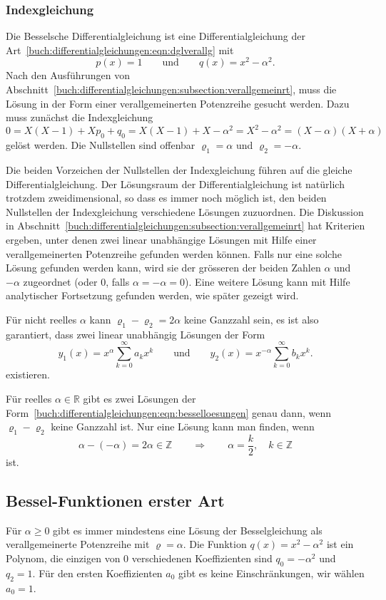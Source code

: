 %
%
\subsubsection{Indexgleichung}
Die Besselsche Differentialgleichung ist eine Differentialgleichung
der Art~\eqref{buch:differentialgleichungen:eqn:dglverallg} mit
\[
p(x) = 1
\qquad\text{und}\qquad
q(x) = x^2-\alpha^2.
\]
Nach den Ausführungen von
Abschnitt~\ref{buch:differentialgleichungen:subsection:verallgemeinrt},
muss die Lösung in der Form einer verallgemeinerten Potenzreihe 
gesucht werden.
Dazu muss zunächst die Indexgleichung
\[
0
=
X(X-1) + Xp_0 + q_0
=
X(X-1) + X - \alpha^2
=
X^2-\alpha^2
=
(X-\alpha)(X+\alpha)
\]
gelöst werden.
Die Nullstellen sind offenbar $\varrho_1=\alpha$ und $\varrho_2=-\alpha$.

Die beiden Vorzeichen der Nullstellen der Indexgleichung führen
auf die gleiche Differentialgleichung.
Der Lösungsraum der Differentialgleichung ist natürlich trotzdem
zweidimensional, so dass es immer noch möglich ist, den
beiden Nullstellen der Indexgleichung verschiedene Lösungen
zuzuordnen.
Die Diskussion in
Abschnitt~\ref{buch:differentialgleichungen:subsection:verallgemeinrt}
hat Kriterien ergeben, unter denen zwei linear unabhängige Lösungen
mit Hilfe einer verallgemeinerten Potenzreihe gefunden werden können.
Falls nur eine solche Lösung gefunden werden kann, wird sie der grösseren
der beiden Zahlen $\alpha$ und $-\alpha$ zugeordnet
(oder $0$, falls $\alpha=-\alpha=0$).
Eine weitere Lösung kann mit Hilfe analytischer Fortsetzung gefunden werden,
wie später gezeigt wird.

Für nicht reelles $\alpha$ kann $\varrho_1-\varrho_2=2\alpha$ keine 
Ganzzahl sein, es ist also garantiert, dass zwei linear unabhängig
Lösungen der Form
\begin{equation}
y_1(x) = x^\alpha\sum_{k=0}^\infty a_kx^k
\qquad\text{und}\qquad
y_2(x) = x^{-\alpha}\sum_{k=0}^\infty b_kx^k.
\label{buch:differentialgleichungen:eqn:besselloesungen}
\end{equation}
existieren.

Für reelles $\alpha\in\mathbb{R}$ gibt es zwei Lösungen der
Form~\eqref{buch:differentialgleichungen:eqn:besselloesungen}
genau dann, wenn $\varrho_1-\varrho_2$ keine Ganzzahl ist.
Nur eine Lösung kann man finden, wenn 
\[
\alpha-(-\alpha)=2\alpha \in \mathbb{Z}
\qquad\Rightarrow\qquad
\alpha = \frac{k}{2},\quad k\in\mathbb{Z}
\]
ist.

%
%
\subsection{Bessel-Funktionen erster Art
\label{buch:differentialgleichungen:subsection:bessel1steart}}
Für $\alpha \ge 0$ gibt es immer mindestens eine Lösung der Besselgleichung
als verallgemeinerte Potenzreihe mit $\varrho=\alpha$.
Die Funktion $q(x)=x^2-\alpha^2$ ist ein Polynom, die einzigen
von $0$ verschiedenen Koeffizienten sind $q_0=-\alpha^2$
und $q_2=1$.
Für den ersten Koeffizienten $a_0$ gibt es keine Einschränkungen,
wir wählen $a_0=1$.

